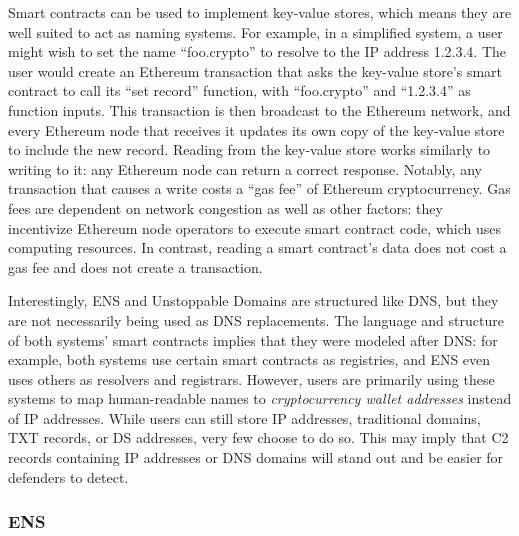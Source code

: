 Smart contracts can be used to implement key-value stores, which means they are 
well suited to act as naming 
systems. For example, in a simplified system, a user might wish to set the name 
``foo.crypto'' to resolve to the IP address 1.2.3.4. The user would create an 
Ethereum transaction that asks the key-value store's smart 
contract 
to call its ``set record'' function, with ``foo.crypto'' and 
``1.2.3.4'' as function inputs. 
This transaction is then broadcast to the Ethereum network, 
and every Ethereum 
node that receives it updates its own copy of the key-value store to include 
the new record. Reading from the key-value store works similarly to writing to 
it: any Ethereum node can return a correct response. 
Notably, any transaction that causes a write costs a ``gas 
fee'' of Ethereum cryptocurrency. Gas fees are 
dependent on network 
congestion as well as other factors: they incentivize 
Ethereum node operators to execute smart contract code, which 
uses computing resources. In contrast, reading a 
smart contract's data does not cost a gas fee and does not 
create a transaction.

Interestingly, ENS and Unstoppable Domains are structured 
like DNS, but they are not necessarily being used as DNS 
replacements. The language and structure of both systems' 
smart 
contracts implies that they were 
modeled after DNS: for example, both systems use certain 
smart contracts 
as registries, and ENS even uses others as resolvers and 
registrars. However, users are primarily using these systems 
to map human-readable names to \emph{cryptocurrency wallet 
addresses} 
instead of IP addresses. While users can still store IP 
addresses, traditional domains, TXT records, or DS addresses, 
very few choose to do so. This may imply that C2 records containing IP 
addresses or DNS domains will stand out and be easier for defenders to detect.

\subsubsection{ENS}

